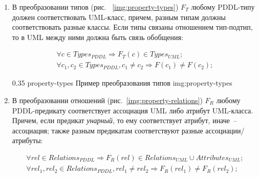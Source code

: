     \begin{enumerate}
        \item В преобразовании типов (рис.
~\ref{img:property-types}) $F_T$ любому PDDL-типу должен соответствовать UML-класс, причем, разным типам должны соответствовать разные классы.
 Если типы связаны отношением тип-подтип, то в UML между ними должна быть связь обобщения:
    
        \begin{center}\begin{eqnarray}\label{eq:types}
            \forall c \in Types_{PDDL} \Rightarrow F_T(c) \in Types_{UML}; \nonumber\\
            \forall c_1, c_2 \in Types_{PDDL}, c_1 \neq c_2 \Rightarrow F(c_1) \neq F(c_2);
        \end{eqnarray}\end{center}
                 
\iffalse        
\begin{figure}[!h]
    \hfill
    \begin{minipage}[h]{0.40\linewidth}
        {\raggedright
        \begin{verbatim}
    (:types
        thing - object
        stone - thing
    )
        \end{verbatim} 
        }
    \end{minipage}
    \hfill
    $\rightarrow$
    \hfill
    \begin{minipage}[h]{0.45\linewidth}
        \center{\texttt{[image: property-types]}}
    \end{minipage}
    \caption{Пример преобразования типов}
    \label{img:property-types}
\end{figure}
\fi

{0.35}
{property-types}
{Пример преобразования типов}
{img:property-types}

        \item В преобразовании отношений (рис.~\ref{img:property-relations}) $F_R$ любому PDDL-предикату соответствует ассоциация UML либо атрибут UML-класса.
 Причем, если предикат \textit{унарный}, то ему соответствует атрибут, иначе~-- ассоциация; также разным предикатам соответствуют разные ассоциации/атрибуты:
    
        {\small\begin{eqnarray}\label{eq:predicates}
        \forall rel \in Relations_{PDDL} \Rightarrow F_R(rel) \in Relations_{UML} \cup Attributes_{UML}; \nonumber\\
        \forall rel_1, rel_2 \in Relations_{PDDL}, rel_1 \neq rel_2 \Rightarrow F_R(rel_1) \neq F_R(rel_2); 
        \end{eqnarray}}


\end{enumerate}
